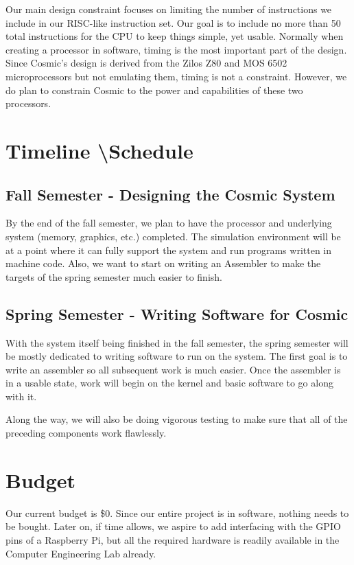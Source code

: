 \documentclass[conference]{IEEEtran}
\begin{document}
Our main design constraint focuses on limiting the number of instructions we include in our RISC-like instruction set. Our goal is to include no more than 50 total instructions for the CPU to keep things simple, yet usable. Normally when creating a processor in software, timing is the most important part of the design. Since Cosmic's design is derived from the Zilos Z80 and MOS 6502 microprocessors but not emulating them, timing is not a constraint. However, we do plan to constrain Cosmic to the power and capabilities of these two processors.


\section{Timeline \textbackslash Schedule}

\subsection{Fall Semester - Designing the Cosmic System}
By the end of the fall semester, we plan to have the processor and underlying system (memory, graphics, etc.) completed. The simulation environment will be at a point where it can fully support the system and run programs written in machine code. Also, we want to start on writing an Assembler to make the targets of the spring semester much easier to finish.

\subsection{Spring Semester - Writing Software for Cosmic}
With the system itself being finished in the fall semester, the spring semester will be mostly dedicated to writing software to run on the system. The first goal is to write an assembler so all subsequent work is much easier. Once the assembler is in a usable state, work will begin on the kernel and basic software to go along with it.

Along the way, we will also be doing vigorous testing to make sure that all of the preceding components work flawlessly.


\section{Budget}

Our current budget is \$0. Since our entire project is in software, nothing needs to be bought. Later on, if time allows, we aspire to add interfacing with the GPIO pins of a Raspberry Pi, but all the required hardware is readily available in the Computer Engineering Lab already.
\end{document}
